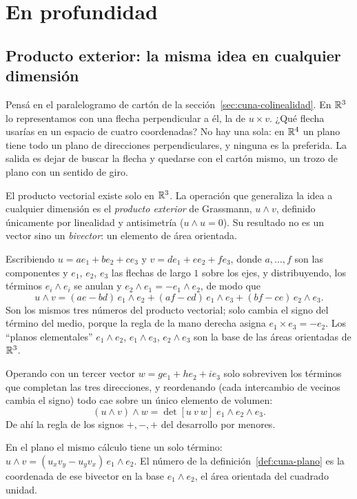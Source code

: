 \section{En profundidad}

\subsection{Producto exterior: la misma idea en cualquier dimensión}\label{sec:exterior}

Pensá en el paralelogramo de cartón de la sección~\ref{sec:cuna-colinealidad}. En \(\mathbb{R}^3\)
lo representamos con una flecha perpendicular a él, la de \(u\times v\). ¿Qué flecha usarías en
un espacio de cuatro coordenadas?
No hay una sola: en \(\mathbb{R}^4\) un plano tiene todo un plano de direcciones perpendiculares, y
ninguna es la preferida. La salida es dejar de buscar la flecha y quedarse con el cartón
mismo, un trozo de plano con un sentido de giro.

El producto vectorial existe solo en \(\mathbb{R}^3\). La operación que
generaliza la idea a cualquier dimensión es el \emph{producto exterior} de Grassmann,
\(u\wedge v\), definido únicamente por linealidad y antisimetría (\(u\wedge u=0\)). Su
resultado no es un vector sino un \emph{bivector}: un elemento de área orientada.

Escribiendo \(u=ae_1+be_2+ce_3\) y \(v=de_1+ee_2+fe_3\), donde \(a,\dots,f\) son las
componentes y \(e_1\), \(e_2\), \(e_3\) las flechas de largo \(1\) sobre los ejes, y
distribuyendo, los términos
\(e_i\wedge e_i\) se anulan y \(e_2\wedge e_1=-e_1\wedge e_2\), de modo que
\[
  u\wedge v=(ae-bd)\,e_1\wedge e_2+(af-cd)\,e_1\wedge e_3+(bf-ce)\,e_2\wedge e_3 .
\]
Son los mismos tres números del producto vectorial; solo cambia el signo del término del
medio, porque la regla de la mano derecha asigna \(e_1\times e_3=-e_2\). Los \enquote{planos
elementales} \(e_1\wedge e_2\), \(e_1\wedge e_3\), \(e_2\wedge e_3\) son la base de las
áreas orientadas de \(\mathbb{R}^3\).

Operando con un tercer vector \(w=ge_1+he_2+ie_3\) solo sobreviven los términos que completan
las tres direcciones, y reordenando (cada intercambio de vecinos cambia el signo) todo cae
sobre un único elemento de volumen:
\[
  (u\wedge v)\wedge w=\det[u\ v\ w]\;e_1\wedge e_2\wedge e_3 .
\]
De ahí la regla de los signos \(+,-,+\) del desarrollo por menores.

En el plano el mismo cálculo tiene un solo término: \(u\wedge v=(u_xv_y-u_yv_x)\,e_1\wedge
e_2\). El número de la definición~\ref{def:cuna-plano} es la coordenada de ese bivector en
la base \(e_1\wedge e_2\), el área orientada del cuadrado unidad.

